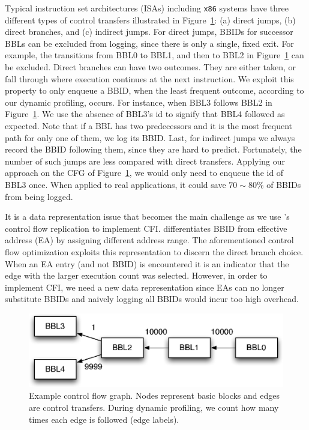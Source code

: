 Typical instruction set architectures (ISAs) including {\tt x86} systems have
three different types of control transfers illustrated in
Figure~\ref{fig:cfg0}: (a) direct jumps, (b) direct branches, and (c) indirect
jumps. For direct jumps, BBIDs for successor BBLs can be excluded from logging,
since there is only a single, fixed exit. For example, the transitions from
BBL0 to BBL1, and then to BBL2 in Figure~\ref{fig:cfg0} can be excluded. Direct
branches can have two outcomes.  They are either taken, or fall through where
execution continues at the next instruction. We exploit this property to only
enqueue a BBID, when the least frequent outcome, according to our dynamic
profiling, occurs. For instance, when BBL3 follows BBL2 in
Figure~\ref{fig:cfg0}. We use the absence of BBL3’s id to signify that BBL4
followed as expected. Note that if a BBL has two predecessors and it is the
most frequent path for only one of them, we log its BBID. Last, for indirect
jumps we always record the BBID following them, since they are hard to predict.
Fortunately, the number of such jumps are less compared with direct transfers.
%
Applying our approach on the CFG of Figure~\ref{fig:cfg0}, we would only need
to enqueue the id of BBL3 once. When applied to real applications, it could
save $70 \sim 80 \%$ of BBIDs from being logged.

It is a data representation issue that becomes the main challenge as we use
\sreplica's control flow replication to implement CFI. \sreplica differentiates
BBID from effective address (EA) by assigning different address range.
The aforementioned control flow optimization exploits this representation to
discern the direct branch choice. 
%
When an EA entry (and not BBID) is encountered it is an indicator that the edge with
the larger execution count was selected.  However, in order to implement CFI,
we need a new data representation since EAs can no longer substitute BBIDs and
naively logging all BBIDs would incur too high overhead.

\begin{figure}[tb]
    \centering
    \includegraphics[width=0.64\linewidth]{figs/cfg0.eps}
    \caption{Example control flow graph. Nodes represent basic blocks and edges
    are control transfers. During dynamic profiling, we count how many times
    each edge is followed (edge labels). \label{fig:cfg0}}
\end{figure}

